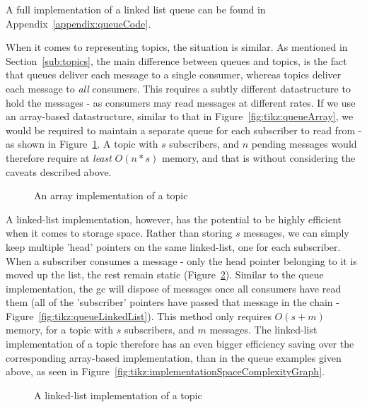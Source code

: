 A full implementation of a linked list queue can be found in
Appendix~\ref{appendix:queueCode}.

When it comes to representing topics, the situation is similar. As mentioned in
Section~\ref{sub:topics}, the main difference between queues and topics, is the
fact that queues deliver each message to a single consumer, whereas topics
deliver each message to \emph{all} consumers. This requires a subtly different
datastructure to hold the messages - as consumers may read messages at different
rates. If we use an array-based datastructure, similar to that in
Figure~\ref{fig:tikz:queueArray}, we would be required to maintain a separate
queue for each subscriber to read from - as shown in
Figure~\ref{fig:tikz:arrayTopic}. A topic with $s$ subscribers, and $n$ pending
messages would therefore require at \emph{least} $O(n * s)$ memory, and that is
without considering the caveats described above. \\

\begin{figure}[H]
  \centering
  
  \caption{An array implementation of a topic}
  \label{fig:tikz:arrayTopic}
\end{figure}

A linked-list implementation, however, has the potential to be highly efficient
when it comes to storage space. Rather than storing $s$ messages, we can simply
keep multiple 'head' pointers on the same linked-list, one for each subscriber.
When a subscriber consumes a message - only the head pointer belonging to it is
moved up the list, the rest remain static
(Figure~\ref{fig:tikz:linkedListTopic}). Similar to the queue implementation,
the \gls{gc} will dispose of messages once all consumers have read them (all of
the 'subscriber' pointers have passed that message in the chain -
Figure~\ref{fig:tikz:queueLinkedList}). This method only requires $O(s + m)$
memory, for a topic with $s$ subscribers, and $m$ messages. The linked-list
implementation of a topic therefore has an even bigger efficiency saving over
the corresponding array-based implementation, than in the queue examples given
above, as seen in Figure~\ref{fig:tikz:implementationSpaceComplexityGraph}.

\begin{figure}[H]
  \centering
  
  \caption{A linked-list implementation of a topic}
  \label{fig:tikz:linkedListTopic}
\end{figure}

